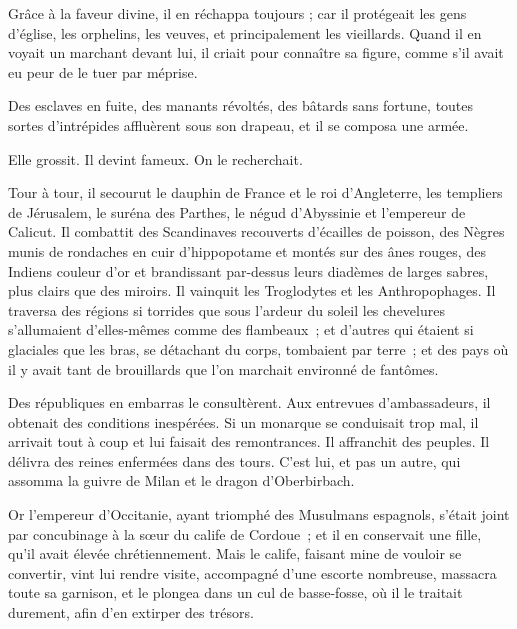 \documentclass[]{book}
\begin{document}
                Grâce à la faveur divine, il en réchappa toujours ; car il protégeait les gens d'église, les orphelins, les veuves, et principalement les vieillards. Quand il en voyait un marchant devant lui, il criait pour connaître sa figure, comme s'il avait eu peur de le tuer par méprise.
                    
                Des esclaves en fuite, des manants révoltés, des bâtards sans fortune, toutes sortes d'intrépides affluèrent sous son drapeau, et il se composa une armée.
                    
                Elle grossit. Il devint fameux. On le recherchait.
                    
                Tour à tour, il secourut le dauphin de France et le roi d'Angleterre, les templiers de Jérusalem, le suréna des Parthes, le négud d'Abyssinie et l'empereur de Calicut. Il combattit des Scandinaves recouverts d'écailles de poisson, des Nègres munis de rondaches en cuir d'hippopotame et montés sur des ânes rouges, des Indiens couleur d'or et brandissant par-dessus leurs diadèmes de larges sabres, plus clairs que des miroirs. Il vainquit les Troglodytes et les Anthropophages. Il traversa des régions si torrides que sous l'ardeur du soleil les chevelures s'allumaient d'elles-mêmes comme des flambeaux ; et d'autres qui étaient si glaciales que les bras, se détachant du corps, tombaient par terre ; et des pays où il y avait tant de brouillards que l'on marchait environné de fantômes.
                    
                Des républiques en embarras le consultèrent. Aux entrevues d'ambassadeurs, il obtenait des conditions inespérées. Si un monarque se conduisait trop mal, il arrivait tout à coup et lui faisait des remontrances. Il affranchit des peuples. Il délivra des reines enfermées dans des tours. C'est lui, et pas un autre, qui assomma la guivre de Milan et le dragon d'Oberbirbach.
                    
                Or l'empereur d'Occitanie, ayant triomphé des Musulmans espagnols, s'était joint par concubinage à la sœur du calife de Cordoue ; et il en conservait une fille, qu'il avait élevée chrétiennement. Mais le calife, faisant mine de vouloir se convertir, vint lui rendre visite, accompagné d'une escorte nombreuse, massacra toute sa garnison, et le plongea dans un cul de basse-fosse, où il le traitait durement, afin d'en extirper des trésors.
                    
\end{document}
